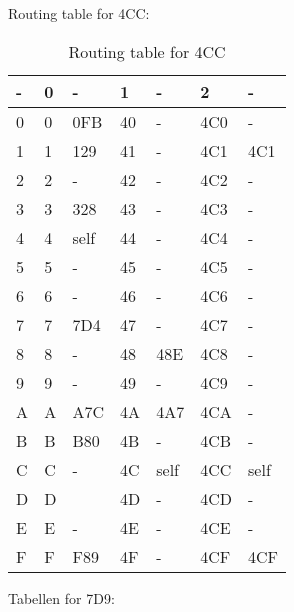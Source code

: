 \documentclass{article}
\begin{document}
Routing table for 4CC:

\begin{table}[ht!]
    \center
    \begin{tabular}{| l | l | l | l | l | l | l |}
    \hline
    - & 0 & -    & 1  & -    & 2   & -    \\
    \hline
    0 & 0 & 0FB  & 40 & -    & 4C0 & -    \\
    \hline
    1 & 1 & 129  & 41 & -    & 4C1 & 4C1  \\
    \hline
    2 & 2 & -    & 42 & -    & 4C2 & -    \\
    \hline
    3 & 3 & 328  & 43 & -    & 4C3 & -    \\
    \hline
    4 & 4 & \cellcolor[gray]{0.8} self & 44 & -    & 4C4 & -    \\
    \hline
    5 & 5 & -    & 45 & -    & 4C5 & -    \\
    \hline
    6 & 6 & -    & 46 & -    & 4C6 & -    \\
    \hline
    7 & 7 & 7D4  & 47 & -    & 4C7 & -    \\
    \hline
    8 & 8 & -    & 48 & 48E  & 4C8 & -    \\
    \hline
    9 & 9 & -    & 49 & -    & 4C9 & -    \\
    \hline
    A & A & A7C  & 4A & 4A7  & 4CA & -    \\
    \hline
    B & B & B80  & 4B & -    & 4CB & -    \\
    \hline
    C & C & -    & 4C & \cellcolor[gray]{0.8} self & 4CC & self \\
    \hline
    D & D & ~    & 4D & -    & 4CD & -    \\
    \hline
    E & E & -    & 4E & -    & 4CE & -    \\
    \hline
    F & F & F89  & 4F & -    & 4CF & 4CF  \\
    \hline
    \end{tabular}
    \caption{Routing table for 4CC}
\end{table}

Tabellen for 7D9:
\end{document}
